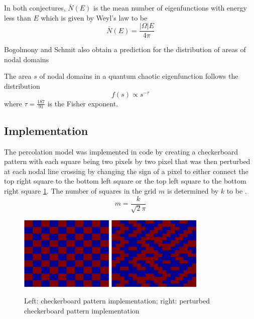 \documentclass{report}
\begin{document}
In both conjectures, $\bar{N}(E)$ is the mean number of eigenfunctions with energy less than $E$ which is given by Weyl's law \cite{garabedian} to be
\[
\bar{N}(E) = \frac{\vert \Omega \vert E}{4 \pi}
\]

Bogolmony and Schmit also obtain a prediction for the distribution of areas of nodal domains

\begin{conj}
  \label{conj:area_prediction}
  The area $s$ of nodal domains in a quantum chaotic eigenfunction follows the distribution
  \begin{equation}
    f(s) \propto s^{-\tau}
  \end{equation}
  where $\tau = \frac{187}{91}$ is the Fisher exponent.
\end{conj}

\subsection{Implementation}
The percolation model was implemented in code by creating a checkerboard pattern with each square being two pixels by two pixel that was then perturbed at each nodal line crossing by changing the sign of a pixel to either connect the top right square to the bottom left square or the top left square to the bottom right square \ref{fig:percolation_implementation}. The number of squares in the grid $m$ is determined by $k$ to be \cite{bogomolny}.
\[
m = \frac{k}{\sqrt{2}\pi}
\]

\begin{figure}
  \begin{center}
    \includegraphics[width=0.4\textwidth]{figs/percolation/checkerboard_implementation.eps}
    \hspace{1 cm}
    \includegraphics[width=0.4\textwidth]{figs/percolation/perturbed_implementation.eps}
    \caption{Left: checkerboard pattern implementation; right: perturbed checkerboard pattern implementation}
    \label{fig:percolation_implementation}
  \end{center}
\end{figure}
\end{document}
